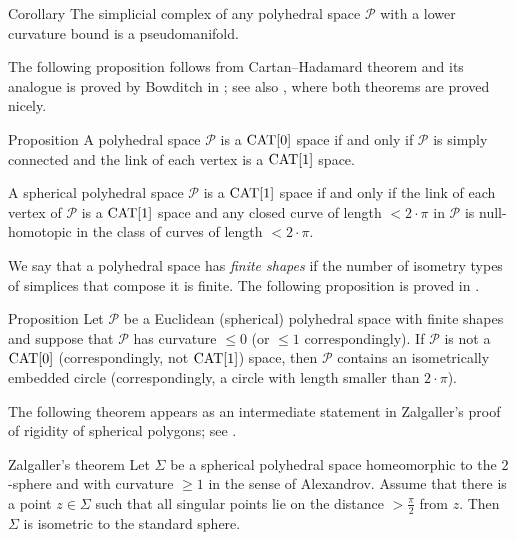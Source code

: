 \documentclass{compositio}
\begin{document}
\begin{thm}{Corollary}
The simplicial complex of any polyhedral space $\mathcal{P}$ with a lower curvature bound is a pseudomanifold.
\end{thm}

The following proposition
follows from Cartan--Hadamard theorem
and its analogue is proved by Bowditch in \cite{bowditch};
see also \cite{akp}, where both theorems are proved nicely.

\begin{thm}{Proposition}\label{prop:poly-cba}
A  polyhedral space $\mathcal{P}$ is a $\mathrm{CAT}[0]$ space
if and only if $\mathcal{P}$ is simply connected
and the link of each vertex is a $\mathrm{CAT}[1]$ space.

A spherical polyhedral space $\mathcal{P}$
is a $\mathrm{CAT}[1]$ space
if and only if  the link of each vertex of $\mathcal{P}$ is a $\mathrm{CAT}[1]$ space
and any closed curve of length $<2\cdot\pi$ in $\mathcal{P}$ is null-homotopic in the class of curves of length $<2\cdot\pi$.
\end{thm}

We say that a polyhedral space has \emph{finite shapes} if the number of isometry types of simplices that compose it is finite.
The following proposition is proved in  \cite[II. 4.17]{bridson-haefliger}.

\begin{thm}{Proposition}\label{geodesic2pi} Let $\mathcal P$ be a Euclidean  (spherical) polyhedral space with finite shapes and suppose that $\mathcal P$ has curvature $\le 0$ (or $\le 1$ correspondingly).
If $\mathcal P$ is not a $\mathrm{CAT}[0]$ (correspondingly, not $\mathrm{CAT}[1]$) space, 
then $\mathcal P$ contains an isometrically embedded
circle (correspondingly, a circle with length smaller than $2{\cdot}\pi$).
\end{thm}

The following theorem appears as an intermediate statement
in Zalgaller's proof of rigidity of spherical polygons;
see \cite{zalgaller}.

\begin{thm}{Zalgaller's theorem}\label{thm:rigid-sphere-2D}
Let $\Sigma$ be a spherical polyhedral space homeomorphic to the $2$-sphere
and with curvature $\ge 1$ in the sense of Alexandrov.
Assume that there is a point $z\in \Sigma$ such that all singular points lie
on the distance $>\tfrac\pi2$ from $z$.
Then $\Sigma$ is isometric to the standard sphere.

\end{thm}
\end{document}
